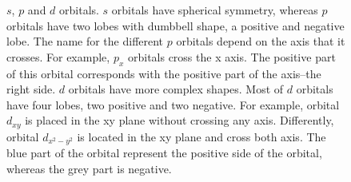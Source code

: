 \documentclass[main.tex]{subfiles}
\begin{document}
\begin{description}
\begin{figure}
\begin{tikzpicture}
      \end{tikzpicture}

    \caption{$s$, $p$ and $d$ orbitals. $s$ orbitals have spherical symmetry, whereas $p$ orbitals have two lobes with dumbbell shape, a positive and negative lobe. The name for the different $p$ orbitals depend on the axis that it crosses. For example, $p_x$ orbitals cross the x axis. The positive part of this orbital corresponds with the positive part of the axis--the right side. $d$ orbitals have more complex shapes. Most of $d$ orbitals have four lobes, two positive and two negative. For example, orbital $d_{xy}$ is placed in the xy plane without crossing any axis. Differently, orbital $d_{x^2-y^2}$ is located in the xy plane and cross both axis. The blue part of the orbital represent the positive side of the orbital, whereas the grey part is negative.}   

 \end{figure}%




 
\end{description}
\end{document}

